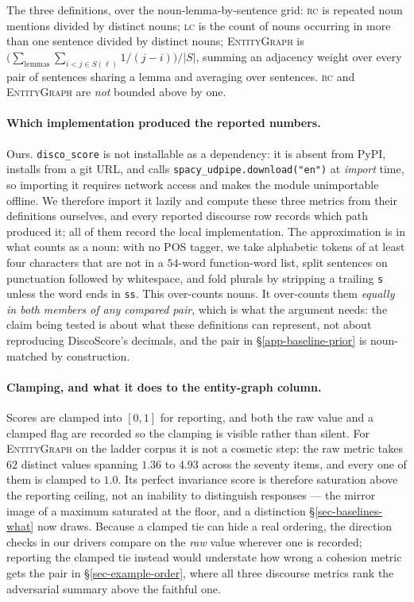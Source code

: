 The three definitions, over the noun-lemma-by-sentence grid: \textsc{rc} is repeated noun mentions
divided by distinct nouns; \textsc{lc} is the count of nouns occurring in more than one sentence
divided by distinct nouns; \textsc{EntityGraph} is $\bigl(\sum_{\text{lemmas}} \sum_{i<j \in
S(\ell)} 1/(j-i)\bigr) / |S|$, summing an adjacency weight over every pair of sentences sharing a
lemma and averaging over sentences. \textsc{rc} and \textsc{EntityGraph} are \emph{not} bounded above
by one.

\paragraph{Which implementation produced the reported numbers.} Ours. \texttt{disco\_score} is not
installable as a dependency: it is absent from PyPI, installs from a git URL, and calls
\texttt{spacy\_udpipe.download("en")} at \emph{import} time, so importing it requires network access
and makes the module unimportable offline. We therefore import it lazily and compute these three
metrics from their definitions ourselves, and every reported discourse row records which path
produced it; all of them record the local implementation. The approximation is in what counts as a
noun: with no POS tagger, we take alphabetic tokens of at least four characters that are not in a
$54$-word function-word list, split sentences on punctuation followed by whitespace, and fold plurals
by stripping a trailing \texttt{s} unless the word ends in \texttt{ss}. This over-counts nouns. It
over-counts them \emph{equally in both members of any compared pair}, which is what the argument
needs: the claim being tested is about what these definitions can represent, not about reproducing
DiscoScore's decimals, and the pair in \S\ref{app-baseline-prior} is noun-matched by construction.

\paragraph{Clamping, and what it does to the entity-graph column.} Scores are clamped into $[0,1]$ for
reporting, and both the raw value and a clamped flag are recorded so the clamping is visible rather
than silent. For \textsc{EntityGraph} on the ladder corpus it is not a cosmetic step: the raw metric
takes $62$ distinct values spanning $1.36$ to $4.93$ across the seventy items, and every one of them
is clamped to $1.0$. Its perfect invariance score is therefore saturation above the reporting ceiling,
not an inability to distinguish responses --- the mirror image of a maximum saturated at the floor, and
a distinction \S\ref{sec-baselines-what} now draws. Because a clamped tie can hide a real ordering, the
direction checks in our drivers compare on the \emph{raw} value wherever one is recorded; reporting the
clamped tie instead would understate how wrong a cohesion metric gets the pair in
\S\ref{sec-example-order}, where all three discourse metrics rank the adversarial summary above the
faithful one.

